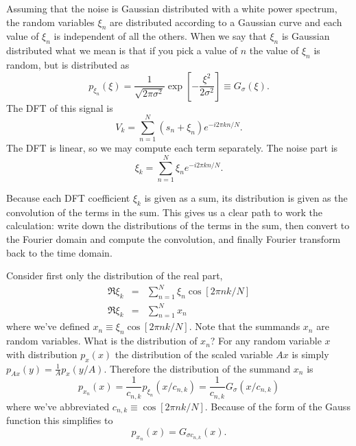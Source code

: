 Assuming that the noise is Gaussian distributed with a white power spectrum, the random variables $\xi_{n}$ are distributed according to a Gaussian curve and each value of $\xi_{n}$ is independent of all the others.
When we say that $\xi_{n}$ is Gaussian distributed what we mean is that if you pick a value of $n$ the value of $\xi_{n}$ is random, but is distributed as \begin{equation}
p_{\xi_{n}}(\xi)=\frac{1}{\sqrt{2\pi\sigma^{2}}}\exp\left[-\frac{\xi^{2}}{2\sigma^{2}}\right]\equiv G_{\sigma}(\xi) \nonumber . \end{equation}
The DFT of this signal is\begin{equation}
V_{k}=\sum_{n=1}^{N}\left(s_{n}+\xi_{n}\right)e^{-i2\pi kn/N} . \end{equation}
The DFT is linear, so we may compute each term separately.
The noise part is  \begin{equation}
\xi_{k}=\sum_{n=1}^{N}\xi_{n}e^{-i2\pi kn/N} . \end{equation}

Because each DFT coefficient $\xi_k$ is given as a sum, its distribution is given as the convolution of the terms in the sum.
This gives us a clear path to work the calculation: write down the distributions of the terms in the sum, then convert to the Fourier domain and compute the convolution, and finally Fourier transform back to the time domain.

Consider first only the distribution of the real part,\begin{eqnarray}
\Re\xi_{k} & = & \sum_{n=1}^{N}\xi_{n}\cos\left[2\pi nk/N\right] \nonumber \\
\Re\xi_{k} & = & \sum_{n=1}^{N}x_{n}\label{eq:sum}\end{eqnarray}
where we've defined $x_{n}\equiv\xi_{n}\cos\left[2\pi nk/N\right]$.
Note that the summands $x_{n}$ are random variables.
What is the distribution of $x_{n}$?
For any random variable $x$ with distribution $p_{x}(x)$ the distribution of the scaled variable $Ax$ is simply $p_{Ax}(y)=\frac{1}{A}p_{x}(y/A)$.
Therefore the distribution of the summand $x_{n}$ is\begin{equation}
p_{x_{n}}(x) = \frac{1}{c_{n,k}}p_{\xi_{n}}(x/c_{n,k})=\frac{1}{c_{n,k}}G_{\sigma}(x/c_{n,k}) \end{equation}
where we've abbreviated $c_{n,k}\equiv\cos\left[2\pi nk/N\right]$.
Because of the form of the Gauss function this simplifies to \begin{equation}
p_{x_{n}}(x)=G_{\sigma c_{n,k}}(x) . \label{eq:summandDistribution} \end{equation}

